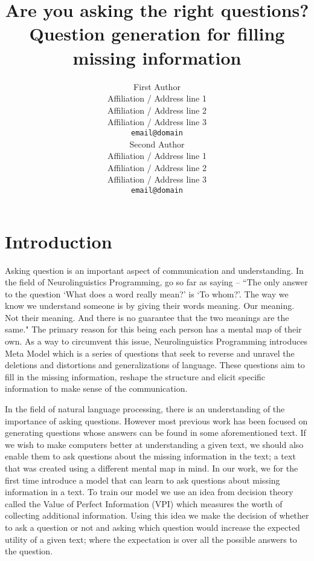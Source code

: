 \documentclass[11pt]{article}
\title{Are you asking the right questions? \\ Question generation for filling missing information}
\author{First Author \\
  Affiliation / Address line 1 \\
  Affiliation / Address line 2 \\
  Affiliation / Address line 3 \\
  {\tt email@domain} \\\And
  Second Author \\
  Affiliation / Address line 1 \\
  Affiliation / Address line 2 \\
  Affiliation / Address line 3 \\
  {\tt email@domain} \\}
\date{}
\begin{document}
\maketitle
\begin{abstract}

\end{abstract}
\section{Introduction}

Asking question is an important aspect of communication and understanding. In the field of Neurolinguistics Programming, \cite{o2011introducing} go so far as saying -- ``The only answer to the question `What does a word really mean?' is `To whom?'. The way we know we understand someone is by giving their words meaning. Our meaning. Not their meaning. And there is no guarantee that the two meanings are the same." The primary reason for this being each person has a mental map of their own. As a way to circumvent this issue, Neurolinguistics Programming introduces Meta Model \cite{bandler1975structure} which is a series of questions that seek to reverse and unravel the deletions and distortions and generalizations of language. These questions aim to fill in the missing information, reshape the structure and elicit specific information to make sense of the communication.

In the field of natural language processing, there is an understanding of the importance of asking questions. However most previous work has been focused on generating questions whose answers can be found in some aforementioned text. If we wish to make computers better at understanding a given text, we should also enable them to ask questions about the missing information in the text; a text that was created using a different mental map in mind. In our work, we for the first time introduce a model that can learn to ask questions about missing information in a text. To train our model we use an idea from decision theory called the Value of Perfect Information (VPI) which measures the worth of collecting additional information. Using this idea we make the decision of whether to ask a question or not and asking which question would increase the expected utility of a given text; where the expectation is over all the possible answers to the question. 
\end{document}
